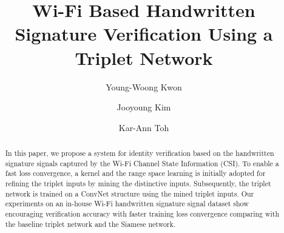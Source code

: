 \documentclass[sigconf]{acmart}
\begin{document}
\title{Wi-Fi Based Handwritten Signature Verification Using a Triplet Network}

\author{Young-Woong Kwon}

\author{Jooyoung Kim}

\author{Kar-Ann Toh}

\renewcommand{\shortauthors}{Y.Kwon, et al.}

\begin{abstract}
    In this paper, we propose a system for identity verification based on the handwritten signature signals captured by the Wi-Fi Channel State Information (CSI). 
    To enable a fast loss convergence, a kernel and the range space learning is initially adopted for refining the triplet inputs by mining the distinctive inputs. 
    Subsequently, the triplet network is trained on a ConvNet structure using the mined triplet inputs. 
    Our experiments on an in-house Wi-Fi handwritten signature signal dataset show encouraging verification accuracy with faster training loss convergence comparing with the baseline triplet network and the Siamese network.
\end{abstract}
\end{document}
